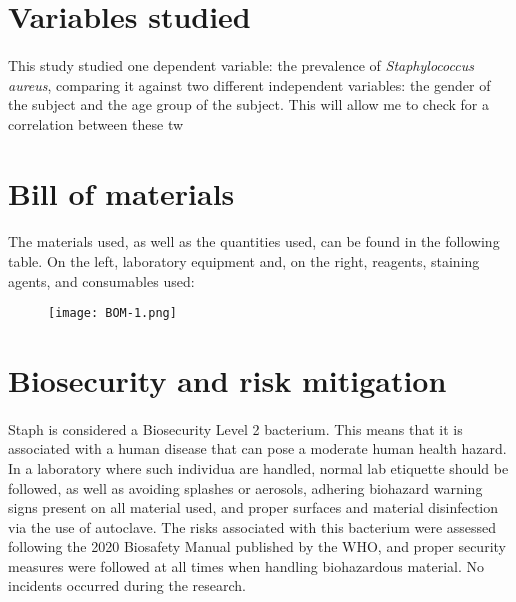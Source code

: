 \section{Variables studied}
\paragraph{}This study studied one dependent variable: the prevalence of \emph{Staphylococcus aureus}, comparing it against two different independent variables: the gender of the subject and the age group of the subject. This will allow me to check for a correlation between these tw
\section{Bill of materials}
\paragraph{}The materials used, as well as the quantities used, can be found in the following table. On the left, laboratory equipment and, on the right, reagents, staining agents, and consumables used:
\begin{center}\begin{figure}[H]\centering\texttt{[image: BOM-1.png]}\end{figure}\end{center}
\section{Biosecurity and risk mitigation}
\paragraph{}Staph is considered a Biosecurity Level 2 bacterium\cite{cheungPathogenicityVirulenceStaphylococcus2021}. This means that it is associated with a human disease that can pose a moderate human health hazard. In a laboratory where such individua are handled, normal lab etiquette should be followed, as well as avoiding splashes or aerosols, adhering biohazard warning signs present on all material used, and proper surfaces and material disinfection via the use of autoclave.\newline
The risks associated with this bacterium were assessed following the 2020 Biosafety Manual published by the WHO, and proper security measures were followed at all times when handling biohazardous material. No incidents occurred during the research\cite{worldhealthorganizationLaboratoryBiosafetyManual2020}.\newpage